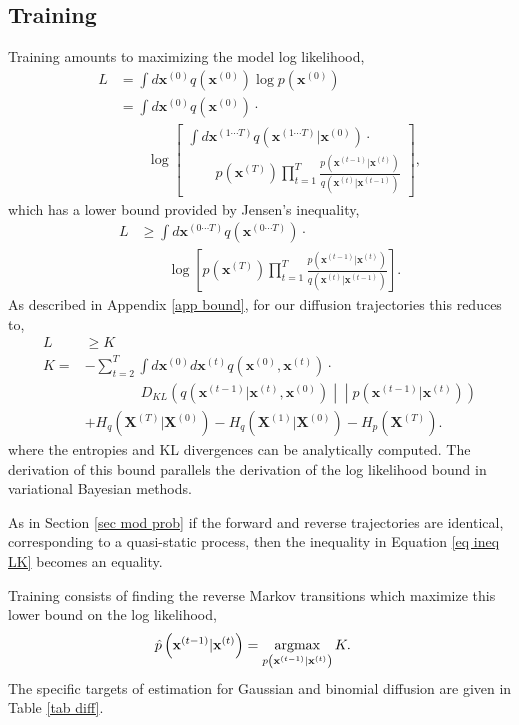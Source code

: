 \documentclass{article}
\newcommand{\mb}{\mathbf}
\newcommand{\argmax}{\operatornamewithlimits{argmax}}
\newcommand{\pf}{q\left( \mb x^{(t)} | \mb x^{(t-1)} \right)}
\newcommand{\qr}{p\left( \mb x^{(t-1)} | \mb x^{(t)} \right)}
\newcommand{\qrhat}{\hat{p}\left( \mb x^{(t-1)} | \mb x^{(t)} \right)}
\newcommand{\pst}{q \left( \mb x^{(0)} \right)}
\newcommand{\qst}{p \left( \mb x^{(T)} \right)}
\newcommand{\ptraj}{q\left( \mb x^{(0\cdots T)} \right)}
\newcommand{\pcondtraj}{q\left( \mb x^{(1\cdots T)} | \mb x^{(0)} \right)}
\newcommand{\qmarg}{p\left( \mb x^{(0)} \right)}
\begin{document}
\subsection{Training}
Training amounts to maximizing the model log likelihood,\\[-1.5em]
\begin{align}
L &= \int d\mb x^{(0)} \pst \log \qmarg \\
&= \int d\mb x^{(0)} \pst \cdot \nonumber \\ & \qquad \log \left[
	\begin{array}{l}
		 \int d\mb x^{(1\cdots T)} \pcondtraj \cdot \\
		\qquad \qst \prod_{t=1}^T \frac{\qr}{\pf}
	\end{array}
	 \right] \label{eq pre jen},
\end{align}
which has a lower bound provided by Jensen's inequality,
\begin{align}
L &\geq \int d\mb x^{(0 \cdots T)} \ptraj \cdot \nonumber \\ & \qquad \log \left[ \qst \prod_{t=1}^T \frac{\qr}{\pf} \right] \label{eq post jen}
.
\end{align}
As described in Appendix \ref{app bound}, for our diffusion trajectories this reduces to,
\begin{align}
L
&\geq K \label{eq ineq LK}\\
K = & 
-\sum_{t=2}^T \int d\mb x^{(0)}d\mb x^{(t)} q\left( \mb x^{(0)}, \mb x^{(t)} \right) \cdot
\nonumber\\  & \qquad \qquad
	D_{KL}\left( 
		q\left( \mb x^{(t-1)} | \mb x^{(t)}, \mb x^{(0)} \right)
			\middle|\middle|
		\qr
	\right)  \nonumber \\
&	+ H_q\left( \mb X^{(T)} | \mb X^{(0)} \right) - H_q\left( \mb X^{(1)} | \mb X^{(0)} \right)
	- H_p\left( \mb X^{(T)} \right)
.
\end{align}
where the entropies and KL divergences can be analytically computed. The derivation of this bound 
parallels the derivation of the log likelihood bound in variational Bayesian methods.

As in Section \ref{sec mod prob} if the forward and reverse 
trajectories are identical, corresponding to a quasi-static process, then the inequality in Equation \ref{eq ineq LK} becomes an equality.

Training consists of finding the reverse Markov transitions which maximize this lower bound on the log likelihood,
\begin{align}
\qrhat &= \argmax_{\qr}
	K 
.
\end{align}
The specific targets of estimation for Gaussian and binomial diffusion are given in 
Table \ref{tab diff}.
\end{document}
